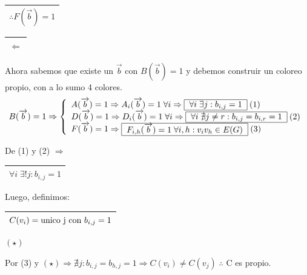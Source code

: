 \documentclass[12pt,a4paper]{report}
\newcounter{neq}
\begin{document}
					\vspace{3mm}
					\begin{center}
						\begin{tabular}{|c|} \hline $\therefore F(\overrightarrow{b}) = 1$\\ \hline \end{tabular}
					\end{center}

			\vspace{3mm}
			\begin{tabular}{|c|} \hline $\Leftarrow$ \\ \hline \end{tabular} Ahora sabemos que existe un $\overrightarrow{b}$ con $B(\overrightarrow{b}) = 1$ y debemos construir un coloreo propio, con a lo sumo 4 colores.
				\begin{equation*}
					B(\overrightarrow{b}) = 1\Rightarrow
		  			\left \lbrace
		  			\begin{array}{l}
		    		 A(\overrightarrow{b}) = 1 \Rightarrow A_{i}(\overrightarrow{b}) = 1 \; \forall i \Rightarrow \textup{\begin{tabular}{|c|} \hline $\forall i \; \exists j : b_{i, j}  = 1$ \\ \hline \end{tabular}} \; (1) \\
		     		 D(\overrightarrow{b}) = 1 \Rightarrow D_{i}(\overrightarrow{b}) = 1 \; \forall i \Rightarrow  \textup{\begin{tabular}{|c|} \hline $\forall i \; \nexists j \neq r : b_{i, j} = b_{i, r} = 1$ \\ \hline \end{tabular}} \; (2) \\
		     		 F(\overrightarrow{b}) = 1 \Rightarrow \textup{\begin{tabular}{|c|} \hline $F_{i, h}(\overrightarrow{b}) = 1 \; \forall i, h : v_{i} v_{h} \in E(G)$ \\ \hline \end{tabular}} \; (3)
		  			\end{array}
		  			\right.
				\end{equation*}
				\par De (1) y (2) $\Rightarrow$ \begin{tabular}{|c|} \hline $\forall i \; \exists ! j : b_{i, j} = 1$ \\ \hline \end{tabular}

				\vspace{2mm}
				\par Luego, definimos: 
				\begin{center}
					\begin{tabular}{|c|} \hline $C(v_{i}) = \textup{unico j con } b_{i, j} = 1$ \\ \hline \end{tabular} $(\star)$
				\end{center}
				\vspace{1mm}
				\par Por (3) y $(\star) \Rightarrow \nexists j : b_{i, j}  = b_{h, j} = 1 \Rightarrow C(v_{i}) \neq C(v_{j}) \; \therefore$ C es propio.
\end{document}
